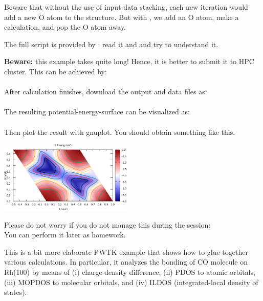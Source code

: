 \documentclass[landscape]{foils}
\begin{document}
Beware that without the use of input-data stacking, each new iteration
would add a new O atom to the structure. But with , we add an O atom, make a calculation, and pop the O atom
away.

The full script is provided by ; read it and and try
to understand it.

{\bf Beware:} this example takes quite long! Hence, it is better to
submit it to HPC cluster. This can be achieved by:\\[0.5em]
\\[0.5em]
After calculation finishes, download the output and data files as:\\[0.5em]
\\[0.5em]
The resulting potential-energy-surface can be visualized as:\\[0.5em]
\\[0.5em]
Then plot the result with gnuplot. You should obtain something like
this.\\

\centerline{\includegraphics[width=0.475\textwidth]{figs/PES-2D.png}}


\vspace*{5mm}

\begin{center}
Please do not worry if you do not manage this during the session:\\You can
perform it later as homework.
\end{center}


This is a bit more elaborate PWTK example that shows how to glue
together various calculations. In particular, it analyzes the bonding
of CO molecule on Rh(100) by means of (i) charge-density difference,
(ii) PDOS to atomic orbitals, (iii) MOPDOS to molecular orbitals, and
(iv) ILDOS (integrated-local density of states).
\end{document}
